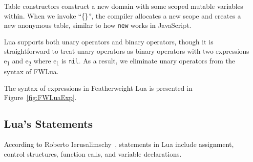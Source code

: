 Table constructors
construct a new domain with some scoped mutable variables within.
When we invoke ``\{\}'', the compiler allocates a new scope
and creates a new anonymous table, similar to how {\tt new} works in JavaScript.

Lua supports both
unary operators and binary operators, though it is straightforward to treat unary operators as binary operators
with two expressions e\textsubscript{1} and e\textsubscript{2} where e\textsubscript{1} is {\tt nil}.
As a result, we eliminate unary operators from the syntax of FWLua.


The syntax of expressions in Featherweight Lua is presented in Figure~\ref{fig:FWLuaExp}.


\subsection{Lua's Statements}
According to Roberto Ierusalimschy~\cite{PIL},
statements in Lua include assignment, control structures, function calls, and variable declarations.

